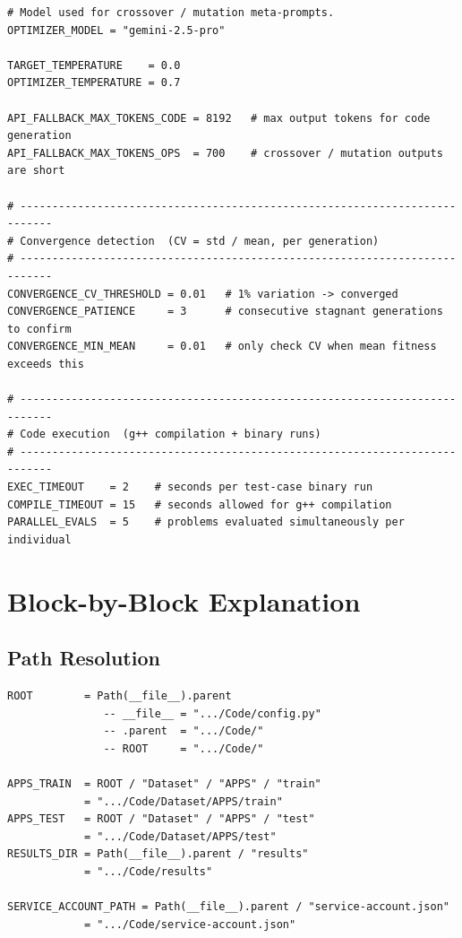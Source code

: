 \documentclass[11pt,a4paper]{report}
\newcommand{\pyfile}[1]{\texttt{#1}}
\begin{document}
\begin{lstlisting}[style=pycode, caption={\pyfile{config.py} --- complete source.}]
# Model used for crossover / mutation meta-prompts.
OPTIMIZER_MODEL = "gemini-2.5-pro"

TARGET_TEMPERATURE    = 0.0
OPTIMIZER_TEMPERATURE = 0.7

API_FALLBACK_MAX_TOKENS_CODE = 8192   # max output tokens for code generation
API_FALLBACK_MAX_TOKENS_OPS  = 700    # crossover / mutation outputs are short

# ---------------------------------------------------------------------------
# Convergence detection  (CV = std / mean, per generation)
# ---------------------------------------------------------------------------
CONVERGENCE_CV_THRESHOLD = 0.01   # 1% variation -> converged
CONVERGENCE_PATIENCE     = 3      # consecutive stagnant generations to confirm
CONVERGENCE_MIN_MEAN     = 0.01   # only check CV when mean fitness exceeds this

# ---------------------------------------------------------------------------
# Code execution  (g++ compilation + binary runs)
# ---------------------------------------------------------------------------
EXEC_TIMEOUT    = 2    # seconds per test-case binary run
COMPILE_TIMEOUT = 15   # seconds allowed for g++ compilation
PARALLEL_EVALS  = 5    # problems evaluated simultaneously per individual
\end{lstlisting}

\section{Block-by-Block Explanation}

\subsection{Path Resolution}

\begin{lstlisting}[style=chain]
ROOT        = Path(__file__).parent
               -- __file__ = ".../Code/config.py"
               -- .parent  = ".../Code/"
               -- ROOT     = ".../Code/"

APPS_TRAIN  = ROOT / "Dataset" / "APPS" / "train"
            = ".../Code/Dataset/APPS/train"
APPS_TEST   = ROOT / "Dataset" / "APPS" / "test"
            = ".../Code/Dataset/APPS/test"
RESULTS_DIR = Path(__file__).parent / "results"
            = ".../Code/results"

SERVICE_ACCOUNT_PATH = Path(__file__).parent / "service-account.json"
            = ".../Code/service-account.json"
\end{lstlisting}
\end{document}
